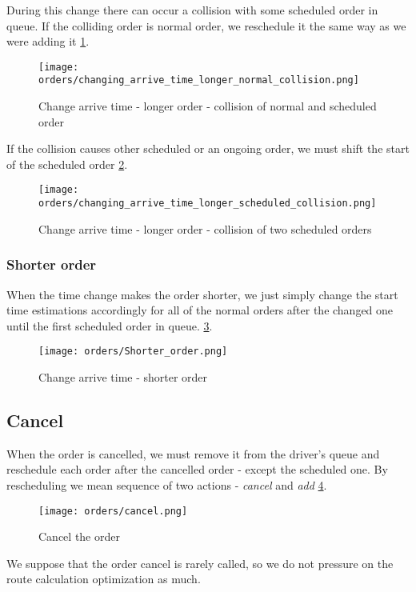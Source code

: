 	During this change there can occur a collision with some scheduled order in queue. If the colliding order is normal order, we reschedule it the same way as we were adding it \ref{order-process-change_collision_normal}. 
	
	\begin{figure}[h]\centering
		\texttt{[image: orders/changing\_arrive\_time\_longer\_normal\_collision.png]}
		\caption{Change arrive time - longer order - collision of normal and scheduled order} 
		\label{order-process-change_collision_normal}
	\end{figure} 

	If the collision causes other scheduled or an ongoing order, we must shift the start of the scheduled order \ref{order-process-change_collision_scheduled}.
	
	\begin{figure}[h]\centering
		\texttt{[image: orders/changing\_arrive\_time\_longer\_scheduled\_collision.png]}
		\caption{Change arrive time - longer order - collision of two scheduled orders} 
		\label{order-process-change_collision_scheduled}
	\end{figure} 
	
	
	\subsubsection{Shorter order}
		When the time change makes the order shorter, we just simply change the start time estimations accordingly for all of the normal orders after the changed one until the first scheduled order in queue.
		\ref{order-process-change-shorter}.
		
		\begin{figure}[h]\centering
			\texttt{[image: orders/Shorter\_order.png]}
			\caption{Change arrive time - shorter order} 
			\label{order-process-change-shorter}
		\end{figure} 
	
\subsection{Cancel}
	When the order is cancelled, we must remove it from the driver's queue and reschedule each order after the cancelled order - except the scheduled one. By rescheduling we mean sequence of two actions - \textit{cancel} and \textit{add} \ref{order-process-cancel}.
	
	\begin{figure}[h]\centering
		\texttt{[image: orders/cancel.png]}
		\caption{Cancel the order} 
		\label{order-process-cancel}
	\end{figure} 
	We suppose that the order cancel is rarely called, so we do not pressure on the route calculation optimization as much.

